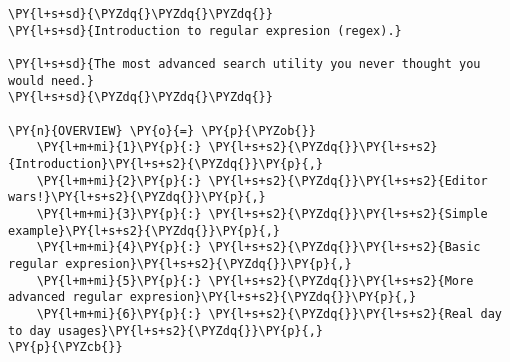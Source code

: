 

\section*{}

\begin{Verbatim}[commandchars=\\\{\}]
\PY{l+s+sd}{\PYZdq{}\PYZdq{}\PYZdq{}}
\PY{l+s+sd}{Introduction to regular expresion (regex).}

\PY{l+s+sd}{The most advanced search utility you never thought you would need.}
\PY{l+s+sd}{\PYZdq{}\PYZdq{}\PYZdq{}}

\PY{n}{OVERVIEW} \PY{o}{=} \PY{p}{\PYZob{}}
    \PY{l+m+mi}{1}\PY{p}{:} \PY{l+s+s2}{\PYZdq{}}\PY{l+s+s2}{Introduction}\PY{l+s+s2}{\PYZdq{}}\PY{p}{,}
    \PY{l+m+mi}{2}\PY{p}{:} \PY{l+s+s2}{\PYZdq{}}\PY{l+s+s2}{Editor wars!}\PY{l+s+s2}{\PYZdq{}}\PY{p}{,}
    \PY{l+m+mi}{3}\PY{p}{:} \PY{l+s+s2}{\PYZdq{}}\PY{l+s+s2}{Simple example}\PY{l+s+s2}{\PYZdq{}}\PY{p}{,}
    \PY{l+m+mi}{4}\PY{p}{:} \PY{l+s+s2}{\PYZdq{}}\PY{l+s+s2}{Basic regular expresion}\PY{l+s+s2}{\PYZdq{}}\PY{p}{,}
    \PY{l+m+mi}{5}\PY{p}{:} \PY{l+s+s2}{\PYZdq{}}\PY{l+s+s2}{More advanced regular expresion}\PY{l+s+s2}{\PYZdq{}}\PY{p}{,}
    \PY{l+m+mi}{6}\PY{p}{:} \PY{l+s+s2}{\PYZdq{}}\PY{l+s+s2}{Real day to day usages}\PY{l+s+s2}{\PYZdq{}}\PY{p}{,}
\PY{p}{\PYZcb{}}
\end{Verbatim}

